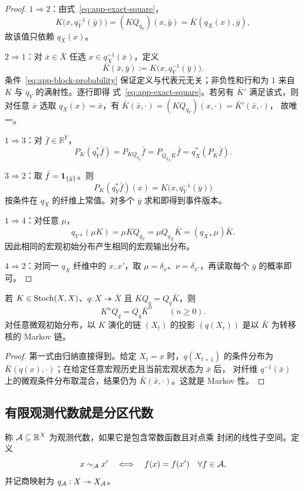 \begin{proof}
$1\Rightarrow2$：由式~\eqref{eq:app-exact-square}，
\[
 K\bigl(x,q_Y^{-1}(\bar y)\bigr)
 =(KQ_{q_Y})(x,\bar y)
 =\bar K(q_X(x),\bar y),
\]
故该值只依赖 $q_X(x)$。

$2\Rightarrow1$：对 $\bar x\in\bar X$ 任选 $x\in q_X^{-1}(\bar x)$，定义
\[
  \bar K(\bar x,\bar y)
  :=K\bigl(x,q_Y^{-1}(\bar y)\bigr).
\]
条件~\eqref{eq:app-block-probability} 保证定义与代表元无关；非负性和行和为
$1$ 来自 $K$ 与 $q_Y$ 的满射性。逐行即得
式~\eqref{eq:app-exact-square}。若另有 $\bar K'$ 满足该式，则对任意
$\bar x$ 选取 $q_X(x)=\bar x$，有
$\bar K(\bar x,\cdot)=(KQ_{q_Y})(x,\cdot)=\bar K'(\bar x,\cdot)$，
故唯一。

$1\Rightarrow3$：对 $\bar f\in\mathbb R^{\bar Y}$，
\[
 P_K(q_Y^*\bar f)
 =P_{KQ_{q_Y}}\bar f
 =P_{Q_{q_X}\bar K}\bar f
 =q_X^*(P_{\bar K}\bar f).
\]

$3\Rightarrow2$：取 $\bar f=\mathbf 1_{\{\bar y\}}$。则
\[
  P_K(q_Y^*\bar f)(x)
  =K\bigl(x,q_Y^{-1}(\bar y)\bigr)
\]
按条件在 $q_X$ 的纤维上常值。对多个 $\bar y$ 求和即得到事件版本。

$1\Rightarrow4$：对任意 $\mu$，
\[
  q_{Y*}(\mu K)=\mu KQ_{q_Y}
  =\mu Q_{q_X}\bar K=(q_{X*}\mu)\bar K.
\]
因此相同的宏观初始分布产生相同的宏观输出分布。

$4\Rightarrow2$：对同一 $q_X$ 纤维中的 $x,x'$，取
$\mu=\delta_x$、$\nu=\delta_{x'}$，再读取每个 $\bar y$ 的概率即可。
\end{proof}

\begin{corollary}[齐次系统的全过程投影]
\label{cor:app-exact-process}
若 $K\in\operatorname{Stoch}(X,X)$、$q:X\twoheadrightarrow\bar X$ 且
$KQ_q=Q_q\bar K$，则
\[
  K^nQ_q=Q_q\bar K^n\qquad(n\ge0).
\]
对任意微观初始分布，以 $K$ 演化的链 $(X_t)$ 的投影 $(q(X_t))$ 是以
$\bar K$ 为转移核的 Markov 链。
\end{corollary}

\begin{proof}
第一式由归纳直接得到。给定 $X_t=x$ 时，$q(X_{t+1})$ 的条件分布为
$\bar K(q(x),\cdot)$；在给定任意宏观历史且当前宏观状态为 $\bar x$ 后，
对纤维 $q^{-1}(\bar x)$ 上的微观条件分布取混合，结果仍为
$\bar K(\bar x,\cdot)$。这就是 Markov 性。
\end{proof}

\subsection{有限观测代数就是分区代数}

称 $\mathcal A\subseteq\mathbb R^X$ 为观测代数，如果它是包含常数函数且对点乘
封闭的线性子空间。定义
\[
 x\sim_{\mathcal A}x'
 \quad\Longleftrightarrow\quad
 f(x)=f(x')\quad\forall f\in\mathcal A,
\]
并记商映射为 $q_{\mathcal A}:X\twoheadrightarrow X_{\mathcal A}$。

